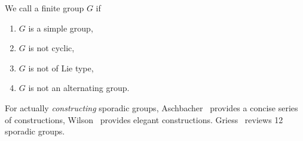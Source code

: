 \begin{definition}
  We call a finite group $G$  if
  \begin{enumerate}
  \item $G$ is a simple group,
  \item $G$ is not cyclic,
  \item $G$ is not of Lie type,
  \item $G$ is not an alternating group.
  \end{enumerate}
\end{definition}

\begin{def-remark}[References]
For actually \emph{constructing} sporadic groups,
Aschbacher~\cite{aschbacher1994sporadic} provides a concise series of
constructions, Wilson~\cite{wilson2009finite} provides elegant
constructions. Griess~\cite{griess1998twelve} reviews 12 sporadic
groups.
\end{def-remark}

